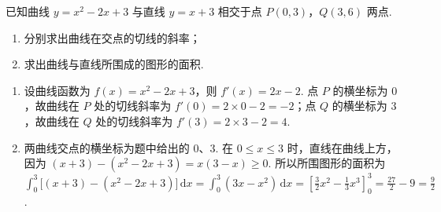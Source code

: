 \begin{problem}
已知曲线 \(y=x^2-2x+3\) 与直线 \(y=x+3\) 相交于点 \(P(0,3)\)，\(Q(3,6)\) 两点.

\begin{enumerate}
\item 分别求出曲线在交点的切线的斜率；
\item 求出曲线与直线所围成的图形的面积.
\end{enumerate}
\end{problem}

\begin{solution}
\begin{enumerate}
\item 设曲线函数为 \(f(x)=x^2-2x+3\)，则 \(f'(x)=2x-2\). 点 \(P\) 的横坐标为 \(0\)，故曲线在 \(P\) 处的切线斜率为 \(f'(0)=2\times0-2=-2\)；点 \(Q\) 的横坐标为 \(3\)，故曲线在 \(Q\) 处的切线斜率为 \(f'(3)=2\times3-2=4\).

\item 两曲线交点的横坐标为题中给出的 \(0\)、\(3\). 在 \(0\le x\le3\) 时，直线在曲线上方，因为 \((x+3)-(x^2-2x+3)=x(3-x)\ge0\). 所以所围图形的面积为 \(\displaystyle\int_0^3\bigl[(x+3)-(x^2-2x+3)\bigr]\,\mathrm{d}x=\int_0^3(3x-x^2)\,\mathrm{d}x=\left[\frac{3}{2}x^2-\frac{1}{3}x^3\right]_0^3=\frac{27}{2}-9=\frac{9}{2}\).
\end{enumerate}
\end{solution}
